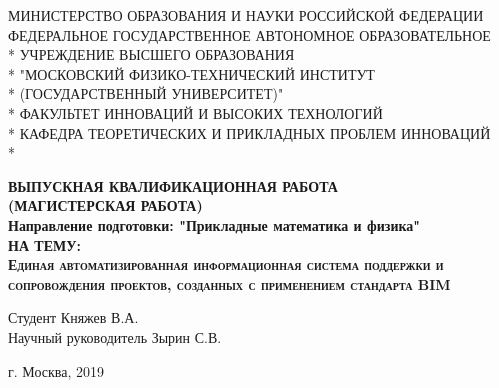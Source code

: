 \begin{titlepage}
\newpage

\begin{center}
\small МИНИСТЕРСТВО ОБРАЗОВАНИЯ И НАУКИ РОССИЙСКОЙ ФЕДЕРАЦИИ \\
\vspace{1cm}
\small ФЕДЕРАЛЬНОЕ ГОСУДАРСТВЕННОЕ АВТОНОМНОЕ ОБРАЗОВАТЕЛЬНОЕ \\*
\small УЧРЕЖДЕНИЕ ВЫСШЕГО ОБРАЗОВАНИЯ \\*
\small "МОСКОВСКИЙ ФИЗИКО-ТЕХНИЧЕСКИЙ ИНСТИТУТ \\*
\small (ГОСУДАРСТВЕННЫЙ УНИВЕРСИТЕТ)" \\*
\vspace{1cm}
\small ФАКУЛЬТЕТ ИННОВАЦИЙ И ВЫСОКИХ ТЕХНОЛОГИЙ \\*
\small КАФЕДРА ТЕОРЕТИЧЕСКИХ И ПРИКЛАДНЫХ ПРОБЛЕМ ИННОВАЦИЙ \\*
\hrulefill
\end{center}

\vspace{4em}

\begin{center}
\textbf{ВЫПУСКНАЯ КВАЛИФИКАЦИОННАЯ РАБОТА} \\
\vspace{1em}
\small \textbf{(МАГИСТЕРСКАЯ РАБОТА)} \\
\vspace{1em}
\small \textbf{Направление подготовки: "Прикладные математика и физика"} \\
\vspace{1em}
\textsc{\textbf{НА ТЕМУ:}} \\
\vspace{2em}
\large \textsc{\textbf{Единая автоматизированная информационная система поддержки и сопровождения проектов, созданных с применением стандарта BIM}}
\end{center}

\vspace{6em}

\begin{flushleft}
Студент \hrulefill Княжев В.А. \\
\vspace{1em}
Научный руководитель \hrulefill Зырин С.В.\\
\vspace{1em}
\end{flushleft}

\vspace{\fill}

\begin{center}
г. Москва, 2019
\end{center}

\end{titlepage}